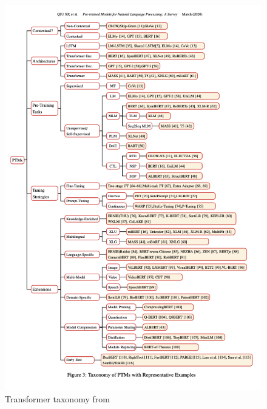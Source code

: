 \documentclass{article}
\begin{document}
\begin{figure}
    \centering
    \includegraphics[width=\textwidth,height=\textheight,keepaspectratio]{02-08.png}
    \caption{Transformer taxonomy from \cite{qiu2020pre}}
    \label{fig:taxonomy}
\end{figure}


  
\end{document}
